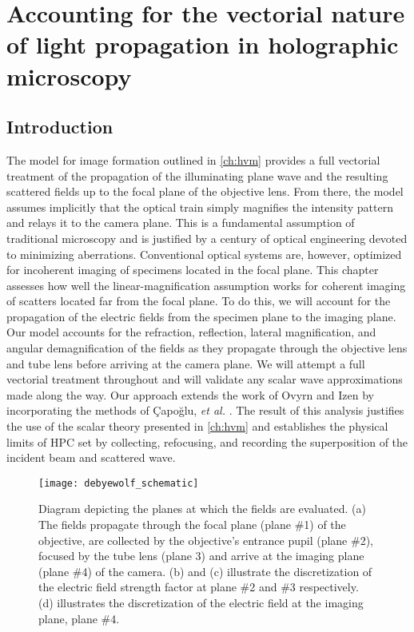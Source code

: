 \chapter{Accounting for the vectorial nature of light propagation in holographic microscopy}
\label{ch:debye}

\section{Introduction}

The model for image formation outlined in \autoref{ch:hvm} provides a full
vectorial treatment of the propagation of the illuminating plane wave and
the resulting scattered fields up to the focal plane of the objective lens.
From there, the model assumes implicitly that the optical train
simply magnifies the intensity pattern and relays it to the camera plane.
This is a fundamental assumption of traditional microscopy and is justified
by a century of optical engineering devoted to minimizing aberrations.
Conventional optical systems are, however, optimized for incoherent imaging of
specimens located in the focal plane.
This chapter assesses how well the linear-magnification assumption works for
coherent imaging of scatters located far from the focal plane. To do this, we will
account for the propagation of the electric fields from
the specimen plane to the imaging plane. Our model accounts for the
refraction, reflection, lateral magnification, and angular demagnification
of the fields as they propagate through the objective lens and tube lens
before arriving at the camera plane. We will attempt a full vectorial
treatment throughout and will validate any scalar wave approximations
made along the way. Our approach extends the work of
Ovyrn and Izen\cite{izen00} by incorporating the methods of \c{C}apo\u{g}lu, \emph{et al.}
\cite{capoglu12}. 
The result of this analysis justifies the use of the scalar theory presented in \autoref{ch:hvm} and
establishes the physical limits of HPC set by collecting, refocusing, and recording
the superposition of the incident beam and scattered wave.

\begin{figure}
  \centering
  \texttt{[image: debyewolf\_schematic]}
  \caption{Diagram depicting the planes at which the fields are evaluated.
    (a) The fields propagate through the focal plane (plane \#1) of the objective,
    are collected by the objective's entrance pupil (plane \#2), focused by the tube lens (plane 3)
    and arrive at the imaging plane (plane \#4) of the camera. (b) and (c) illustrate the
    discretization of the electric field strength factor at plane \#2 and \#3 respectively.
    (d) illustrates the discretization of the electric field at the imaging plane, plane \#4.}
  \label{fig:debye_schematic}
\end{figure}

